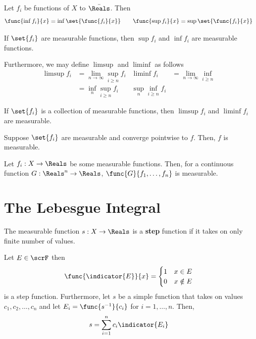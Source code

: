 \begin{definition}
    Let \(f_i\) be functions of \(X\) to \(\bar{\Reals}\). Then 
    \begin{equation*}
        \func{\inf f_i}{x} = \inf \set{\func{f_i}{x}} \qquad \func{\sup f_i}{x} = \sup \set{\func{f_i}{x}}
    \end{equation*}
\end{definition}

\begin{theorem}
    If \(\set{f_i}\) are measurable functions, then \(\sup f_i\) and \(\inf f_i\) are measurable functions.
\end{theorem}

Furthermore, we may define \(\limsup\) and \(\liminf\) as follows
\begin{align*}
    \limsup f_i &= \lim_{n \to \infty} \sup_{i \geq n} f_i & \liminf f_i &= \lim_{n \to \infty} \inf_{i \geq n}\\
    &= \inf_n \sup_{i \geq n} f_i & \sup_n \inf_{i \geq n } f_i    
\end{align*}
\begin{corollary}
    If \(\set{f_i}\) is a collection of measurable functions, then \(\limsup f_i\) and \(\liminf f_i\) are measurable. 
\end{corollary}

\begin{corollary}
    Suppose \(\set{f_i}\) are measurable and converge pointwise to \(f\). Then, \(f\) is measurable.
\end{corollary}

\begin{theorem}
    Let \(f_i : X \to \Reals\) be some measurable functions. Then, for a continuous function \(G:\Reals^n \to \Reals\), \(\func{G}{f_1, \dots , f_n}\) is measurable. 
\end{theorem}
\section{The Lebesgue Integral}
The measurable function \(s:X \to \Reals\) is a \textbf{step} function if it takes on only finite number of values. 

\begin{example}
    Let \(E \in \scrF\) then 
    \begin{equation*}
        \func{\indicator{E}}{x} = \begin{cases}
            1 & x \in E\\
            0 & x \notin E
        \end{cases}
    \end{equation*}
    is a step function. Furthermore, let \(s\) be a simple function that takes on values \(c_1, c_2,\dots, c_n\) and let \(E_i = \func{s^{-1}}{c_i}\) for \(i = 1, \dots, n\). Then, 
    \begin{equation*}
        s = \sum_{i = 1}^n c_i \indicator{E_i}
    \end{equation*}
\end{example}

